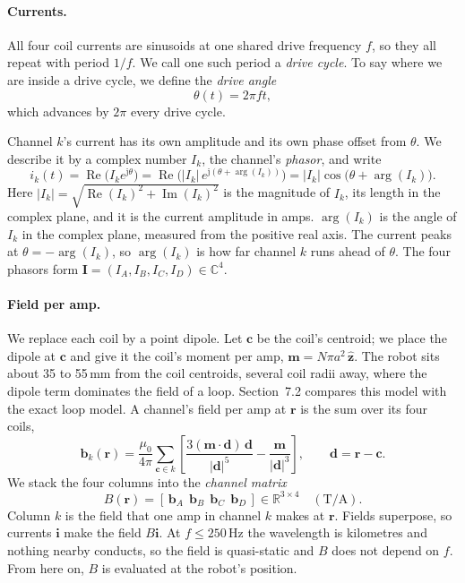 \documentclass[11pt]{article}
\newcommand{\R}{\mathbb{R}}
\newcommand{\C}{\mathbb{C}}
\newcommand{\vb}[1]{\mathbf{#1}}
\newcommand{\uv}[1]{\hat{\mathbf{#1}}}
\newcommand{\jj}{\mathrm{j}}
\renewcommand{\Re}{\operatorname{Re}}
\renewcommand{\Im}{\operatorname{Im}}
\begin{document}
\paragraph{Currents.} All four coil currents are sinusoids at one shared drive frequency $f$, so
they all repeat with period $1/f$. We call one such period a \emph{drive cycle}. To say where we
are inside a drive cycle, we define the \emph{drive angle}
\begin{equation}
  \theta(t) = 2\pi f t ,
\end{equation}
which advances by $2\pi$ every drive cycle.

Channel $k$'s current has its own amplitude and its own phase offset from $\theta$. We describe
it by a complex number $I_k$, the channel's \emph{phasor}, and write
\begin{equation}
  i_k(t) = \Re\!\big(I_k e^{\jj\theta}\big)
  = \Re\!\big(|I_k|\,e^{\jj(\theta + \arg(I_k))}\big)
  = |I_k|\cos\!\big(\theta + \arg(I_k)\big).
\end{equation}
Here $|I_k| = \sqrt{\Re(I_k)^2 + \Im(I_k)^2}$ is the magnitude of $I_k$, its length in the
complex plane, and it is the current amplitude in amps. $\arg(I_k)$ is the angle of $I_k$ in the
complex plane, measured from the positive real axis. The current peaks at $\theta = -\arg(I_k)$,
so $\arg(I_k)$ is how far channel $k$ runs ahead of $\theta$. The four phasors form
$\vb I = (I_A, I_B, I_C, I_D)\in\C^4$.

\paragraph{Field per amp.} We replace each coil by a point dipole. Let $\vb c$ be the coil's
centroid; we place the dipole at $\vb c$ and give it the coil's moment per amp,
$\vb m = N\pi a^2\,\uv z$. The robot sits about 35 to 55\,mm from the coil centroids, several coil
radii away, where the dipole term dominates the field of a loop. Section~7.2 compares this model
with the exact loop model. A channel's field per amp at $\vb r$ is the sum over its four coils,
\begin{equation}
  \vb b_k(\vb r) = \frac{\mu_0}{4\pi}\sum_{\vb c\in k}\left[
  \frac{3(\vb m\cdot\vb d)\,\vb d}{|\vb d|^5} - \frac{\vb m}{|\vb d|^3}\right],
  \qquad \vb d = \vb r - \vb c .
\end{equation}
We stack the four columns into the \emph{channel matrix}
\begin{equation}
  B(\vb r) = [\,\vb b_A\ \ \vb b_B\ \ \vb b_C\ \ \vb b_D\,]\in\R^{3\times4}\quad(\text{T/A}).
\end{equation}
Column $k$ is the field that one amp in channel $k$ makes at $\vb r$. Fields superpose, so
currents $\vb i$ make the field $B\vb i$. At $f\le 250$\,Hz the wavelength is kilometres and
nothing nearby conducts, so the field is quasi-static and $B$ does not depend on $f$. From here
on, $B$ is evaluated at the robot's position.
\end{document}
